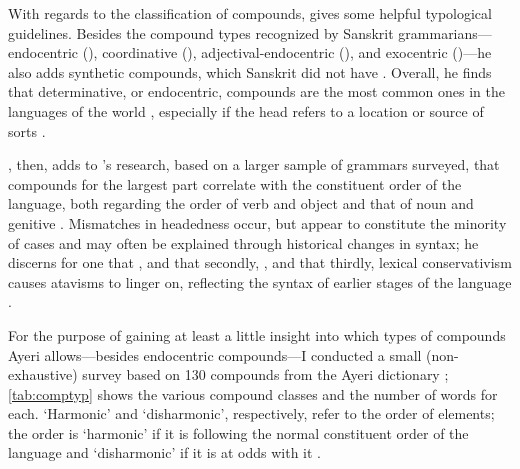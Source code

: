 With regards to the classification of compounds, \citet{bauer2001} gives some 
helpful typological guidelines. Besides the compound types recognized by 
Sanskrit grammarians---endocentric (), coordinative 
(), adjectival-endo\-cent\-ric (), and 
exocentric ()---he also adds synthetic compounds, which Sanskrit 
did not have \citep[697]{bauer2001}. Overall, he finds that determinative, or 
endocentric, compounds are the most common ones in the languages of the world 
\citep[697]{bauer2001}, especially if the head refers to a location or source 
of sorts \citep[702]{bauer2001}.

\citet{gaeta2008}, then, adds to \citet{bauer2001}'s research, based on a 
larger sample of grammars surveyed, that compounds for the largest part 
correlate with the constituent order of the language, both regarding the order 
of verb and object and that of noun and genitive \citep[129--133]{gaeta2008}. 
Mismatches in headedness occur, but appear to constitute the minority of cases 
and may often be explained through historical changes in syntax; he discerns  
for one that , and that secondly, , and that 
thirdly, lexical conservativism causes atavisms to linger on, reflecting the 
syntax of earlier stages of the language \citep[138--139]{gaeta2008}.

For the purpose of gaining at least a little insight into which types of 
compounds Ayeri allows---besides endocentric compounds---I conducted a small 
(non-exhaustive) survey based on 130 compounds from the Ayeri dictionary 
\citep[Dictionary]{benung}; \autoref{tab:comptyp} shows the various compound 
classes and the number of words for each. `Harmonic' and `disharmonic', 
respectively, refer to the order of elements; the order is `harmonic' 
if it is following the normal constituent order of the language and 
`disharmonic' if it is at odds with it \citep{gaeta2008}.

